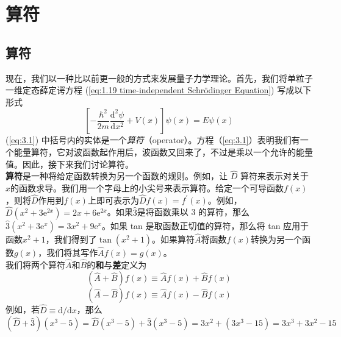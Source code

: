 \chapter{算符}
\label{chap:3}
\section{算符}
	\label{sec:3.1 Operators}
	现在，我们以一种比以前更一般的方式来发展量子力学理论。首先，我们将单粒子一维定态薛定谔方程 (\ref{eq:1.19 time-independent Schrödinger Equation}) 写成以下形式
	\begin{equation}
		\left[-\frac{\hbar^2}{2m}\frac{\mathrm{d}^2\psi}{\mathrm{d}x^2}+V\left(x\right)\right]\psi\left(x\right) = E\psi\left(x\right)
		\label{eq:3.1}
	\end{equation}
	(\ref{eq:3.1}) 中括号内的实体是一个\textit{算符}（operator）。方程（\ref{eq:3.1}）表明我们有一个能量算符，它对波函数起作用后，波函数又回来了，不过是乘以一个允许的能量值。因此，接下来我们讨论算符。\\
	\indent \textbf{算符}是一种将给定函数转换为另一个函数的规则。例如，让 $\hat{D}$ 算符来表示对关于$x$的函数求导。我们用一个字母上的小尖号来表示算符。给定一个可导函数$f\left(x\right)$，则将$\hat{D}$作用到$f\left(x\right)$上即可表示为$\hat{D}f\left(x\right) = f^{\prime}\left(x\right)$。例如，$\hat{D}\left(x^2+3\mathrm{e}^{2x}\right) = 2x+6\mathrm{e}^{2x}$。如果$\hat{3}$是将函数乘以 3 的算符，那么$\hat{3}\left(x^2+3\mathrm{e}^x\right) = 3x^2+9\mathrm{e}^x$。如果 tan 是取函数正切值的算符，那么将 tan 应用于函数$x^2+1$，我们得到了$\tan\left(x^2+1\right)$。如果算符$\hat{A}$将函数$f\left(x\right)$转换为另一个函数$g\left(x\right)$，我们将其写作$\hat{A}f\left(x\right) = g\left(x\right)$。\\
	\indent 我们将两个算符$\hat{A}$和$\hat{B}$的\textbf{和}与\textbf{差}定义为
	\begin{equation}
		\boxed{
			\left(\hat{A}+\hat{B}\right)f\left(x\right) \equiv \hat{A}f\left(x\right)+\hat{B}f\left(x\right)
		}
		\label{eq:3.2 definition of operators' sum and differenct}
	\end{equation}
	\begin{equation*}
		\left(\hat{A}-\hat{B}\right)f\left(x\right) \equiv \hat{A}f\left(x\right)-\hat{B}f\left(x\right)
	\end{equation*}
	例如，若$\hat{D} \equiv \mathrm{d}/\mathrm{d}x$，那么
	\begin{equation*}
		\left(\hat{D}+\hat{3}\right)\left(x^3-5\right) = \hat{D}\left(x^3-5\right)+ \hat{3}\left(x^3-5\right) = 3x^2+\left(3x^3-15\right) = 3x^3+3x^2-15
	\end{equation*}
